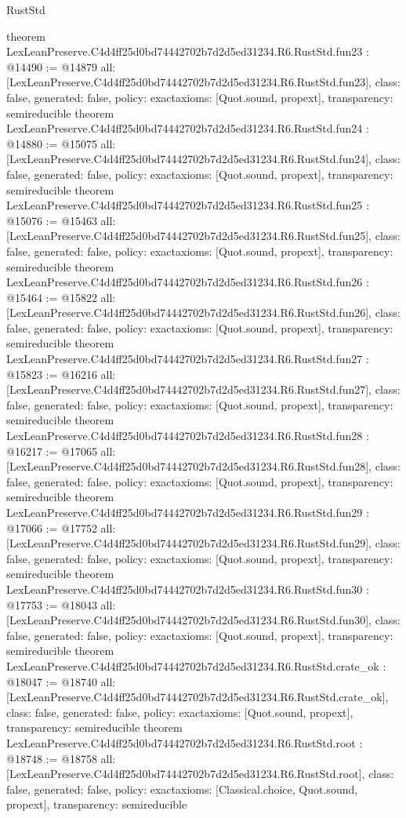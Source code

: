 \begin{lexlean}{RustStd}
\begin{coremodule}
{}
theorem LexLeanPreserve.C4d4ff25d0bd74442702b7d2d5ed31234.R6.RustStd.fun23 : @14490 := @14879 {
  all: [LexLeanPreserve.C4d4ff25d0bd74442702b7d2d5ed31234.R6.RustStd.fun23],
  class: false,
  generated: false,
  policy: exact{axioms: [Quot.sound, propext]},
  transparency: semireducible
}
theorem LexLeanPreserve.C4d4ff25d0bd74442702b7d2d5ed31234.R6.RustStd.fun24 : @14880 := @15075 {
  all: [LexLeanPreserve.C4d4ff25d0bd74442702b7d2d5ed31234.R6.RustStd.fun24],
  class: false,
  generated: false,
  policy: exact{axioms: [Quot.sound, propext]},
  transparency: semireducible
}
theorem LexLeanPreserve.C4d4ff25d0bd74442702b7d2d5ed31234.R6.RustStd.fun25 : @15076 := @15463 {
  all: [LexLeanPreserve.C4d4ff25d0bd74442702b7d2d5ed31234.R6.RustStd.fun25],
  class: false,
  generated: false,
  policy: exact{axioms: [Quot.sound, propext]},
  transparency: semireducible
}
theorem LexLeanPreserve.C4d4ff25d0bd74442702b7d2d5ed31234.R6.RustStd.fun26 : @15464 := @15822 {
  all: [LexLeanPreserve.C4d4ff25d0bd74442702b7d2d5ed31234.R6.RustStd.fun26],
  class: false,
  generated: false,
  policy: exact{axioms: [Quot.sound, propext]},
  transparency: semireducible
}
theorem LexLeanPreserve.C4d4ff25d0bd74442702b7d2d5ed31234.R6.RustStd.fun27 : @15823 := @16216 {
  all: [LexLeanPreserve.C4d4ff25d0bd74442702b7d2d5ed31234.R6.RustStd.fun27],
  class: false,
  generated: false,
  policy: exact{axioms: [Quot.sound, propext]},
  transparency: semireducible
}
theorem LexLeanPreserve.C4d4ff25d0bd74442702b7d2d5ed31234.R6.RustStd.fun28 : @16217 := @17065 {
  all: [LexLeanPreserve.C4d4ff25d0bd74442702b7d2d5ed31234.R6.RustStd.fun28],
  class: false,
  generated: false,
  policy: exact{axioms: [Quot.sound, propext]},
  transparency: semireducible
}
theorem LexLeanPreserve.C4d4ff25d0bd74442702b7d2d5ed31234.R6.RustStd.fun29 : @17066 := @17752 {
  all: [LexLeanPreserve.C4d4ff25d0bd74442702b7d2d5ed31234.R6.RustStd.fun29],
  class: false,
  generated: false,
  policy: exact{axioms: [Quot.sound, propext]},
  transparency: semireducible
}
theorem LexLeanPreserve.C4d4ff25d0bd74442702b7d2d5ed31234.R6.RustStd.fun30 : @17753 := @18043 {
  all: [LexLeanPreserve.C4d4ff25d0bd74442702b7d2d5ed31234.R6.RustStd.fun30],
  class: false,
  generated: false,
  policy: exact{axioms: [Quot.sound, propext]},
  transparency: semireducible
}
theorem LexLeanPreserve.C4d4ff25d0bd74442702b7d2d5ed31234.R6.RustStd.crate_ok : @18047 := @18740 {
  all: [LexLeanPreserve.C4d4ff25d0bd74442702b7d2d5ed31234.R6.RustStd.crate_ok],
  class: false,
  generated: false,
  policy: exact{axioms: [Quot.sound, propext]},
  transparency: semireducible
}
theorem LexLeanPreserve.C4d4ff25d0bd74442702b7d2d5ed31234.R6.RustStd.root : @18748 := @18758 {
  all: [LexLeanPreserve.C4d4ff25d0bd74442702b7d2d5ed31234.R6.RustStd.root],
  class: false,
  generated: false,
  policy: exact{axioms: [Classical.choice, Quot.sound, propext]},
  transparency: semireducible
}


\end{coremodule}
\end{lexlean}
